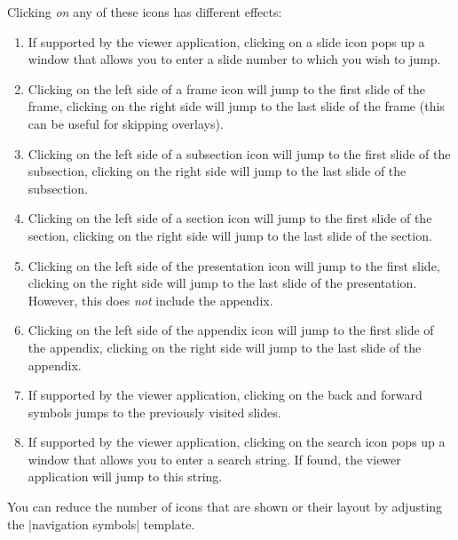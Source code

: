 Clicking \emph{on} any of these icons has different effects:
\begin{enumerate}
\item
  If supported by the viewer application, clicking on a slide icon
  pops up a window that allows you to enter a slide number to which
  you wish to jump.
\item
  Clicking on the left side of a frame icon will jump to the first
  slide of the frame, clicking on the right side will jump to the last
  slide of the frame (this can be useful for skipping overlays).
\item
  Clicking on the left side of a subsection icon will jump to the
  first slide of the subsection, clicking on the right side will jump
  to the last slide of the subsection.
\item
  Clicking on the left side of a section icon will jump to the
  first slide of the section, clicking on the right side will jump
  to the last slide of the section.
\item
  Clicking on the left side of the presentation icon will jump to the
  first slide, clicking on the right side will jump to the last slide
  of the presentation. However, this does \emph{not} include the
  appendix. 
\item
  Clicking on the left side of the appendix icon will jump to the
  first slide of the appendix, clicking on the right side will jump to
  the last slide of the appendix.
\item
  If supported by the viewer application, clicking on the back and
  forward symbols jumps to the previously visited slides.
\item
  If supported by the viewer application, clicking on the search icon
  pops up a window that allows you to enter a search string. If found,
  the viewer application will jump to this string.
\end{enumerate}

You can reduce the number of icons that are shown or their layout by
adjusting the |navigation symbols| template.

